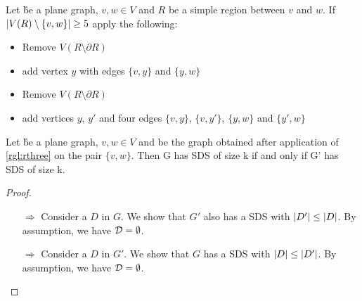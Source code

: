 \begin{rgl}\label{rgl:rthree}
    Let \G be a plane graph, $v, w \in V$ and $R$ be a simple region between $v$ and $w$. If $\abs{V(R) \setminus \{v, w\}} \geq 5$ apply the following:

    \begin{caseof}

            \vspace{-5mm}
            \begin{itemize}
                    \item Remove $V(R\setminus\partial R)$
                    \item add vertex $y$ with edges $\{v, y\}$ and $\{y, w\}$
            \end{itemize}

            \vspace{-5mm}
            \begin{itemize}
                    \item Remove $V(R\setminus\partial R)$
                    \item add vertices $y$, $y'$ and four edges $\{v,y\}$, $\{v, y'\}$, $\{y, w\}$ and $\{y', w\}$
            \end{itemize}
        \end{caseof}
\end{rgl}
\begin{lemma}\label{lemma:correctnessthree}
    Let \G be a plane graph, $v, w \in V$ and \GB be the graph obtained after application of \cref{rgl:rthree} on the pair $\{v, w\}$. Then G has SDS of size k if and only if G' has SDS of size k.
\end{lemma}
\begin{proof}
    \begin{enumerate}
        \item[$\Rightarrow$] Consider a \sdom $D$ in $G$. We show that $G'$ also has a SDS with $\abs{D'} \leq \abs{D}$. By assumption, we have $\mathcal{D} = \emptyset$.
        \item[$\Rightarrow$] Consider a \sdom $D$ in $G'$. We show that $G$ has a SDS with $\abs{D} \leq \abs{D'}$. By assumption, we have $\mathcal{D} = \emptyset$.

    \end{enumerate}
 
\end{proof}

